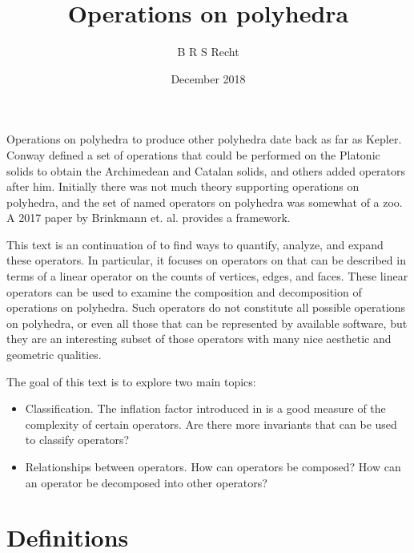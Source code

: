 \documentclass[12pt]{amsart}%
\title{Operations on polyhedra}
\author{B R S Recht}
\date{December 2018}
\begin{document}
\maketitle

Operations on polyhedra to produce other polyhedra date back as far as Kepler.
Conway defined a set of operations that could be performed on the Platonic
solids to obtain the Archimedean and Catalan solids, and others added operators
after him. Initially there was not much theory supporting operations on
polyhedra, and the set of named operators on polyhedra was somewhat of a zoo. A 2017 paper by Brinkmann et. al. provides a framework. \cite{brinkmann}

This text is an continuation of \cite{brinkmann} to find ways to quantify,
analyze, and expand these operators. In particular, it focuses on operators on
that can be described in terms of a linear operator on the counts of vertices,
edges, and faces. These linear operators can be used to examine the composition
and decomposition of operations on polyhedra. Such operators do not constitute
all possible operations on polyhedra, or even all those that can be represented
by available software, but they are an interesting subset of those
operators with many nice aesthetic and geometric qualities.

The goal of this text is to explore two main topics:
\begin{itemize}
  \item Classification. The inflation factor introduced in \cite{brinkmann} is a good measure of the complexity of certain operators.
  Are there more invariants that can be used to classify operators?
  \item Relationships between operators. How can operators be composed? How can
  an operator be decomposed into other operators?
\end{itemize}

\section{Definitions}
\end{document}
